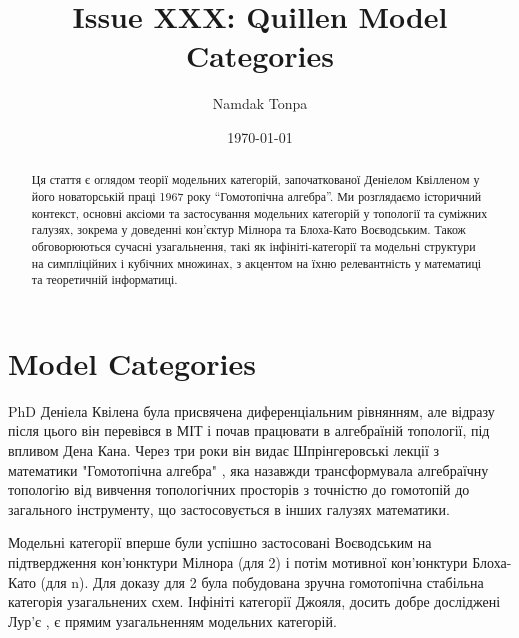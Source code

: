 \documentclass[12pt]{article}
\theoremstyle{plain}
\theoremstyle{definition}
\theoremstyle{remark}
\begin{document}
\title{Issue XXX: Quillen Model Categories}
\author{Namdak Tonpa}
\date{\today}

\maketitle

\begin{abstract}
Ця стаття є оглядом теорії модельних категорій, започаткованої Деніелом Квілленом у його новаторській праці 1967 року ``Гомотопічна алгебра''. Ми розглядаємо історичний контекст, основні аксіоми та застосування модельних категорій у топології та суміжних галузях, зокрема у доведенні кон’єктур Мілнора та Блоха-Като Воєводським. Також обговорюються сучасні узагальнення, такі як інфініті-категорії та модельні структури на симпліційних і кубічних множинах, з акцентом на їхню релевантність у математиці та теоретичній інформатиці.
\end{abstract}

\ifincludeTOC
  \tableofcontents
\fi


\section{Model Categories}
PhD Деніела Квілена була присвячена диференціальним рівнянням, але відразу після цього він перевівся в МІТ і почав працювати в алгебраїній топології, під впливом Дена Кана. Через три роки він видає Шпрінгеровські лекції з математики "Гомотопічна алгебра" \cite{Quillen67}, яка назавжди трансформувала алгебраїчну топологію від вивчення топологічних просторів з точністю до гомотопій до загального інструменту, що застосовується в інших галузях математики.

Модельні категорії вперше були успішно застосовані Воєводським на підтвердження кон'юнктури Мілнора \cite{Voevodsky96} (для 2) і потім мотивної кон'юнктури Блоха-Като \cite{Voevodsky03} (для n). Для доказу для 2 була побудована зручна гомотопічна стабільна категорія узагальнених схем. Інфініті категорії Джояля, досить добре досліджені Лур'є \cite{Lurie09}, є прямим узагальненням модельних категорій.
\end{document}
